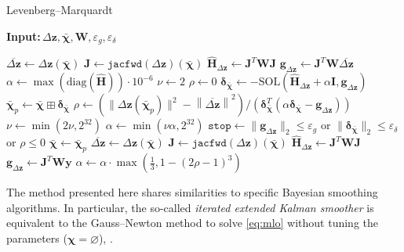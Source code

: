 \documentclass[preprint,12pt]{elsarticle}
\let\vec\bm
\let\mat\mathbf
\def\param{\vec{\chi}}
\let\amssymbboxplus\boxplus
\renewcommand{\boxplus}{\mathbin{\mathop\amssymbboxplus}}
\newcommand{\norm}[1]{\left\lVert#1\right\rVert}
\renewcommand{\algorithmicrequire}{\textbf{Input:\,}}
\numberwithin{equation}{section}
\begin{document}
\def\lmfunc{\Delta \vec{z}}
\def\lmvec{\overline{\lmfunc}}
\begin{algorithm}[ht!]
    \caption{Levenberg--Marquardt}\label{alg:lm}
    \algorithmicrequire $\lmfunc, \bar{\param}, \mat{W}, \varepsilon_g, \varepsilon_\delta$
    \begin{algorithmic}
        \State $\lmvec \gets\lmfunc(\bar{\param})$
        \State $\mat{J} \gets \texttt{jacfwd}(\lmfunc)(\bar{\param})$
        \State $\hat{\mat{H}}_{\lmfunc} \gets \mat{J}^T \mat{W} \mat{J}$
        \State $\vec{g}_{\lmfunc} \gets \mat{J}^T \mat{W} \lmvec$
        \State $\alpha \gets \max(\text{diag}(\hat{\mat{H}})) \cdot 10^{-6}$
        \State $\nu \gets 2$
        \State $\rho \gets 0$
        \State $\vec{\delta}_{\bar{\param}} \gets -\text{SOL}(\hat{\mat{H}}_{\lmfunc} + \alpha \mat{I}, \vec{g}_{\lmfunc})$
        \State $\bar{\param}_p \gets \bar{\param} \boxplus \vec{\delta}_{\bar{\param}}$
        \State $\rho \gets (\|\lmfunc(\bar{\param}_p)\|^2 - \norm{\lmvec}^2)/
            (\vec{\delta}_{\bar{\param}}^T (\alpha \vec{\delta}_{\bar{\param}} - \vec{g}_{\lmfunc}))$
        \State $\nu \gets \min(2\nu, 2^{32})$
        \State $\alpha \gets \min(\nu \alpha, 2^{32})$
        \EndIf
        \EndWhile
        \State $\texttt{stop} \gets \|\vec{g}_{\lmfunc}\|_2 \leq \varepsilon_g$ or $\|\vec{\delta}_{\bar{\param}}\|_2 \leq \varepsilon_\delta$ or $\rho \leq 0$
        \State $\bar{\param} \gets \bar{\param}_p$
        \State $\lmvec \gets\lmfunc(\bar{\param})$
        \State $\mat{J} \gets \texttt{jacfwd}(\lmfunc)(\bar{\param})$
        \State $\hat{\mat{H}}_{\lmfunc}\gets \mat{J}^T \mat{W} \mat{J}$
        \State $\vec{g}_{\lmfunc} \gets \mat{J}^T \mat{W} \vec{y}$
        \State $\alpha \gets \alpha \cdot \max(\frac{1}{3}, 1 - (2\rho - 1)^3)$
        \EndWhile
    \end{algorithmic} 
\end{algorithm} 
The method presented here shares similarities to specific Bayesian smoothing algorithms.
In particular, the so-called \emph{iterated extended Kalman smoother} is equivalent to the Gauss--Newton method to solve \eqref{eq:mlo} without tuning the parameters ($\param = \varnothing$), \cite{bellIteratedKalmanSmoother1994}.
\end{document}
